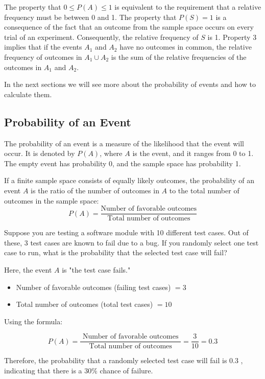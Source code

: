 The property that \( 0 \leq P(A) \leq 1 \) is equivalent to the requirement that a relative frequency must be between 0 and 1. The property that \( P(S) = 1 \) is a consequence of the fact that an outcome from the sample space occurs on every trial of an experiment. Consequently, the relative frequency of \( S \) is 1. Property 3 implies that if the events \( A_1 \) and \( A_2 \) have no outcomes in common, the relative frequency of outcomes in \( A_1 \cup A_2 \) is the sum of the relative frequencies of the outcomes in \( A_1 \) and \( A_2 \).

In the next sections we will see more about the probability of events and how to calculate them.

\subsection*{Probability of an Event}
The probability of an event is a measure of the likelihood that the event will occur. It is denoted by \( P(A) \), where \( A \) is the event, and it ranges from 0 to 1. The empty event has probability 0, and the sample space has probability 1.

\begin{definition}
    If a finite sample space consists of equally likely outcomes, the probability of an event \( A \) is the ratio of the number of outcomes in \(A\) to the total number of outcomes in the sample space:
    \[
    P(A) = \frac{\text{Number of favorable outcomes}}{\text{Total number of outcomes}}
    \]
\end{definition}

\begin{example}
    Suppose you are testing a software module with 10 different test cases. Out of these, 3 test cases are known to fail due to a bug. If you randomly select one test case to run, what is the probability that the selected test case will fail?
\end{example}

\begin{solution}
    Here, the event $A$ is "the test case fails."
\begin{itemize}
    \item Number of favorable outcomes (failing test cases) $=3$
    \item Total number of outcomes (total test cases) $=10$
\end{itemize}

Using the formula:

$$
P(A)=\frac{\text { Number of favorable outcomes }}{\text { Total number of outcomes }}=\frac{3}{10}=0.3
$$


Therefore, the probability that a randomly selected test case will fail is 0.3 , indicating that there is a $30 \%$ chance of failure.
\leavevmode\end{solution}

